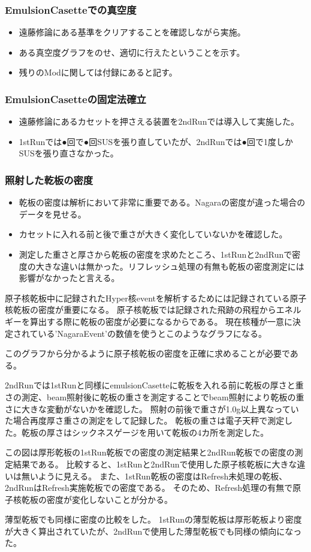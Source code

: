 \documentclass[12pt,a4paper]{jarticle}
\begin{document}
\subsubsection{EmulsionCasetteでの真空度}
\begin{itemize}
 \item 遠藤修論にある基準をクリアすることを確認しながら実施。
 \item ある真空度グラフをのせ、適切に行えたということを示す。
 \item 残りのModに関しては付録にあると記す。
\end{itemize}
\subsubsection{EmulsionCasetteの固定法確立}
\begin{itemize}
 \item 遠藤修論にあるカセットを押さえる装置を2ndRunでは導入して実施した。
 \item 1stRunでは●回で●回SUSを張り直していたが、2ndRunでは●回で1度しかSUSを張り直さなかった。
\end{itemize}
\subsubsection{照射した乾板の密度}
\begin{itemize}
 \item 乾板の密度は解析において非常に重要である。Nagaraの密度が違った場合のデータを見せる。
 \item カセットに入れる前と後で重さが大きく変化していないかを確認した。
 \item 測定した重さと厚さから乾板の密度を求めたところ、1stRunと2ndRunで密度の大きな違いは無かった。リフレッシュ処理の有無も乾板の密度測定には影響がなかったと言える。
\end{itemize}
原子核乾板中に記録されたHyper核eventを解析するためには記録されている原子核乾板の密度が重要になる。
原子核乾板では記録された飛跡の飛程からエネルギーを算出する際に乾板の密度が必要になるからである。
現在核種が一意に決定されている'NagaraEvent'の数値を使うとこのようなグラフになる。
\par
このグラフから分かるように原子核乾板の密度を正確に求めることが必要である。
\par
2ndRunでは1stRunと同様にemulsionCasetteに乾板を入れる前に乾板の厚さと重さの測定、beam照射後に乾板の重さを測定することでbeam照射により乾板の重さに大きな変動がないかを確認した。
照射の前後で重さが1.0g以上異なっていた場合再度厚さ重さの測定をして記録した。
乾板の重さは電子天秤で測定した。乾板の厚さはシックネスゲージを用いて乾板の4カ所を測定した。
\par
この図は厚形乾板の1stRun乾板での密度の測定結果と2ndRun乾板での密度の測定結果である。
比較すると、1stRunと2ndRunで使用した原子核乾板に大きな違いは無いように見える。
また、1stRun乾板の密度はRefresh未処理の乾板、2ndRunはRefresh実施乾板での密度である。
そのため、Refresh処理の有無で原子核乾板の密度が変化しないことが分かる。
\par
薄型乾板でも同様に密度の比較をした。
1stRunの薄型乾板は厚形乾板より密度が大きく算出されていたが、2ndRunで使用した薄型乾板でも同様の傾向になった。
\end{document}
